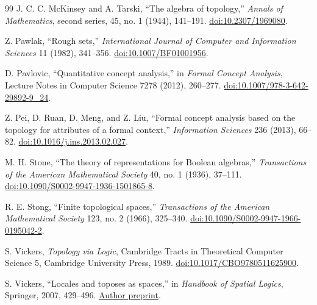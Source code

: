 \documentclass[11pt]{article}
\theoremstyle{definition}
\theoremstyle{plain}
\theoremstyle{remark}
\begin{document}
\begin{thebibliography}{99}
J. C. C. McKinsey and A. Tarski,
``The algebra of topology,''
\emph{Annals of Mathematics}, second series, 45, no. 1 (1944), 141--191.
\href{https://doi.org/10.2307/1969080}{doi:10.2307/1969080}.

Z. Pawlak,
``Rough sets,''
\emph{International Journal of Computer and Information Sciences} 11 (1982),
341--356.
\href{https://doi.org/10.1007/BF01001956}{doi:10.1007/BF01001956}.

D. Pavlovic,
``Quantitative concept analysis,'' in \emph{Formal Concept Analysis},
Lecture Notes in Computer Science 7278 (2012), 260--277.
\href{https://doi.org/10.1007/978-3-642-29892-9_24}
{doi:10.1007/978-3-642-29892-9\_24}.

Z. Pei, D. Ruan, D. Meng, and Z. Liu,
``Formal concept analysis based on the topology for attributes of a formal context,''
\emph{Information Sciences} 236 (2013), 66--82.
\href{https://doi.org/10.1016/j.ins.2013.02.027}
{doi:10.1016/j.ins.2013.02.027}.

M. H. Stone,
``The theory of representations for Boolean algebras,''
\emph{Transactions of the American Mathematical Society} 40, no. 1 (1936),
37--111.
\href{https://doi.org/10.1090/S0002-9947-1936-1501865-8}
{doi:10.1090/S0002-9947-1936-1501865-8}.

R. E. Stong,
``Finite topological spaces,''
\emph{Transactions of the American Mathematical Society} 123, no. 2 (1966),
325--340.
\href{https://doi.org/10.1090/S0002-9947-1966-0195042-2}
{doi:10.1090/S0002-9947-1966-0195042-2}.

S. Vickers,
\emph{Topology via Logic}, Cambridge Tracts in Theoretical Computer Science 5,
Cambridge University Press, 1989.
\href{https://doi.org/10.1017/CBO9780511625900}
{doi:10.1017/CBO9780511625900}.

S. Vickers,
``Locales and toposes as spaces,'' in \emph{Handbook of Spatial Logics},
Springer, 2007, 429--496.
\href{https://sjvickers.github.io/LocTopSpaces.pdf}
{Author preprint}.

\end{thebibliography}
\end{document}
